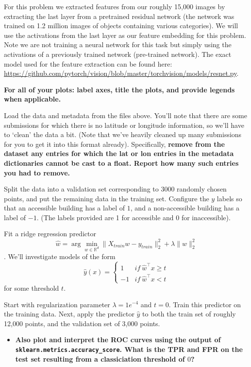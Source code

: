 \documentclass[preview]{standalone}
\begin{document}
For this problem we extracted features from our roughly 15,000 images by
extracting the last layer from a pretrained residual network (the network
was trained on 1.2 million images of objects containing various categories).
We will use the activations from the last layer as our feature embedding for this problem.
Note we are not training a neural network for this task but simply using the activations of a
previously trained network (pre-trained network). The exact model used
for the feature extraction can be found here: \url{https://github.com/pytorch/vision/blob/master/torchvision/models/resnet.py}.

\textbf{For all of your plots: label axes, title the plots, and provide legends when applicable.} 


 \begin{Parts}
\Part Load the data and metadata from the files above. You'll note that there are some submissions for which there is no latitude or longitude information, so we'll have to `clean' the data a bit. (Note that we've heavily cleaned up many submissions for you to get it into this format already). Specifically, \textbf{remove from the dataset any entries for which the lat or lon entries in the metadata dictionaries cannot be cast to a float. Report how many such entries you had to remove.}

\Part Split the data into a validation set corresponding to $3000$ randomly chosen points, and put the remaining data in the training set. Configure the $y$ labels so that an accessible building has a label of $1$, and a non-accessible building has a label of $-1$. (The labels provided are 1 for accessible and 0 for inaccessible). 


\Part Fit a ridge regression predictor 
\[
\hat{w} = \arg\min_{w \in \mathbb{R}^d} \| X_{train}w - y_{train}\|_2^2 + \lambda \|w\|_2^2
\].
We'll investigate models of the form
\[
\hat{y}(x) = \begin{cases} 
1 & if ~ \hat{w}^\top x \geq t \\
-1  & if ~ \hat{w}^\top x < t 
\end{cases}
\]
for some threshold $t$. 

Start with regularization parameter $\lambda = 1e^{-4}$ and $t = 0$. Train this predictor on the training data. Next, apply the predictor $\hat{y}$ to both the train set of roughly 12,000 points, and the validation set of 3,000 points. \begin{itemize}
\item \textbf{ Also plot and interpret the ROC curves using the output of \\
\texttt{sklearn.metrics.accuracy\_score}. What is the TPR and FPR on the test set resulting from a classiciation threshold of $0$?}
\end{itemize}


\end{Parts}
\end{document}
